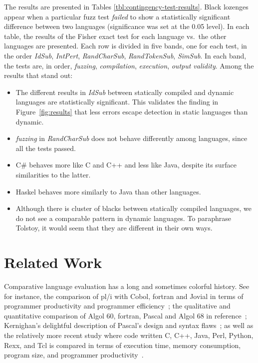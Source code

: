 \documentclass[10pt]{sigplanconf}
\begin{document}
The results are presented in Tables \ref{tbl:contingency-test-results}. 
Black lozenges appear when a
particular fuzz test \emph{failed} to show a statistically significant
difference between two languages (significance was set at the 0.05
level). In each table, the results of the Fisher exact test for each
language vs.\ the other languages are presented. Each row is divided in
five bands, one for each test, in the order {\em IdSub}, {\em
  IntPert}, {\em RandCharSub}, {\em RandTokenSub}, {\em SimSub}. In
each band, the tests are, in order, {\em fuzzing}, {\em compilation},
{\em execution}, {\em output validity}. Among the results that stand
out:
\begin{itemize}
\item The different results in {\em IdSub} between statically compiled
  and dynamic languages are statistically significant. This validates
  the finding in Figure~\ref{fig:results} that less errors escape
  detection in static languages than dynamic.

\item {\em fuzzing} in {\em RandCharSub} does not behave
differently among languages, since all the tests passed.

\item C\# behaves more like C and C++ and less like Java, despite its
  surface similarities to the latter.

\item Haskel behaves more similarly to Java than other languages.

\item Although there is cluster of blacks between statically compiled
  languages, we do not see a comparable pattern in dynamic languages.
  To paraphrase Tolstoy, it would seem that they are different in
  their own ways.
\end{itemize}



\section{Related Work} %
\label{sec:related}

Comparative language evaluation has a long and sometimes colorful history.
See for instance,
the comparison of {\sc pl/i} with Cobol, {\sc fortran} and Jovial in
terms of programmer productivity and programmer efficiency~\cite{RWSB68};
the qualitative and quantitative comparison of Algol 60,
{\sc fortran}, Pascal and Algol 68 in reference~\cite{BOJO80};
Kernighan's delightful description of
Pascal's design and syntax flaws~\cite{Ker81};
as well as the relatively more recent study where code written
C, C++, Java, Perl, Python, Rexx, and Tcl
is compared in terms of execution time, memory consumption,
program size, and programmer productivity~\cite{PREC00}.
\end{document}
